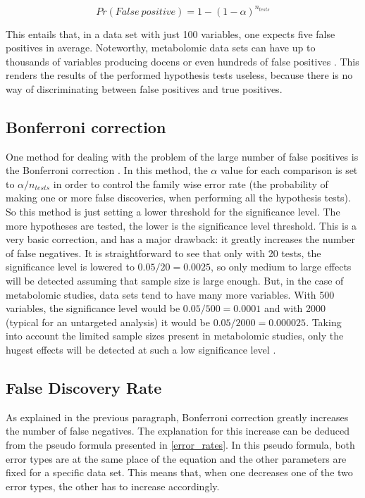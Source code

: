 \begin{equation}
\label{falsos_positivos}
    Pr(False\ positive) = 1-(1-\alpha)^{n_{tests}}
\end{equation}

This entails that, in a data set with just 100 variables, one expects five false positives in average. Noteworthy, metabolomic data sets can have up to thousands of variables producing docens or even hundreds of false positives \parencite{broadhurst2006statistical}. This renders the results of the performed hypothesis tests useless, because there is no way of discriminating between false positives and true positives.

\subsection{Bonferroni correction}
One method for dealing with the problem of the large number of false positives is the Bonferroni correction \parencite{bland1995multiple}. In this method, the $\alpha$ value for each comparison is set to $\alpha /n_{tests}$ in order to control the family wise error rate (the probability of making one or more false discoveries, when performing all the hypothesis tests). So this method is just setting a lower threshold for the significance level. The more hypotheses are tested, the lower is the significance level threshold. This is a very basic correction, and has a major drawback: it greatly increases the number of false negatives. It is straightforward to see that only with 20 tests, the significance level is lowered to $0.05/20 = 0.0025$, so only medium to large effects will be detected assuming that sample size is large enough. But, in the case of metabolomic studies, data sets tend to have many more variables. With 500 variables, the significance level would be $0.05/500=0.0001$ and with 2000 (typical for an untargeted analysis) it would be $0.05/2000=0.000025$. Taking into account the limited sample sizes present in metabolomic studies, only the hugest effects will be detected at such a low significance level \parencite{johnson2010accounting}. 

\subsection{False Discovery Rate}
As explained in the previous paragraph, Bonferroni correction greatly increases the number of false negatives. The explanation for this increase can be deduced from the pseudo formula presented in \autoref{error_rates}. In this pseudo formula, both error types are at the same place of the equation and the other parameters are fixed for a specific data set. This means that, when one decreases one of the two error types, the other has to increase accordingly.

